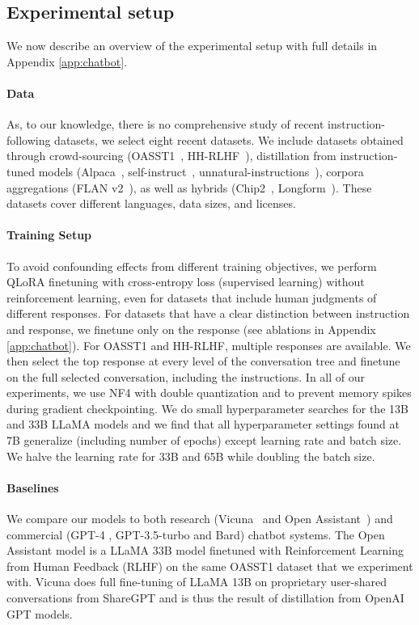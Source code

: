 \subsection{Experimental setup} 
We now describe an overview of the experimental setup with full details in Appendix \ref{app:chatbot}. 

\paragraph{Data} As, to our knowledge, there is no comprehensive study of recent instruction-following datasets, we select eight recent datasets. We include datasets obtained through crowd-sourcing (OASST1~\citep{kopf2023openassistant}, HH-RLHF~\citep{bai2022training}), distillation from instruction-tuned models (Alpaca~\citep{alpaca}, self-instruct~\citep{wang2022self}, unnatural-instructions~\citep{honovich2022unnatural}), corpora aggregations (FLAN v2~\citep{chung2022scaling}), as well as hybrids (Chip2~\citep{laion2023}, Longform~\citep{koksal2023longform}). These datasets cover different languages, data sizes, and licenses. 

\paragraph{Training Setup} 
To avoid confounding effects from different training objectives, we perform QLoRA finetuning with cross-entropy loss (supervised learning) without reinforcement learning, even for datasets that include human judgments of different responses. For datasets that have a clear distinction between instruction and response, we finetune only on the response (see ablations in Appendix \ref{app:chatbot}). For OASST1 and HH-RLHF, multiple responses are available. We then select the top response at every level of the conversation tree and finetune on the full selected conversation, including the instructions. 
In all of our experiments, we use NF4 \method with double quantization and \pagedoptim to prevent memory spikes during gradient checkpointing. We do small hyperparameter searches for the 13B and 33B LLaMA models and we find that all hyperparameter settings found at 7B generalize (including number of epochs) except learning rate and batch size. We halve the learning rate for 33B and 65B while doubling the batch size. 

\paragraph{Baselines} We compare our models to both research (Vicuna~\citep{vicuna2023} and Open Assistant~\citep{kopf2023openassistant}) and commercial (GPT-4 \citep{openai2023gpt}, GPT-3.5-turbo and Bard) chatbot systems. The Open Assistant model is a LLaMA 33B model finetuned with Reinforcement Learning from Human Feedback (RLHF) on the same OASST1 dataset that we experiment with. Vicuna does full fine-tuning of LLaMA 13B on proprietary user-shared conversations from ShareGPT and is thus the result of distillation from OpenAI GPT models.



